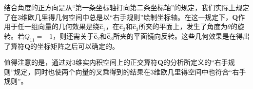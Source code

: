 \documentclass[main.tex]{subfiles}
\begin{document}
结合角度的正方向是从“第一条坐标轴打向第二条坐标轴”的规定，我们实际上规定了在3维欧几里得几何空间中总是以“右手规则”绘制坐标轴。在这一规定下，$\mathbf{Q}$作用于任一组向量的几何效果是绕$\mathbf{\hat{c}}_1$，在$\mathbf{\hat{c}}_2$和$\mathbf{\hat{c}}_3$所夹的平面上，发生了角度为$\theta$的旋转。若$Q_{11}=-1$，则还需关于$\mathbf{\hat{c}}_2$和$\mathbf{\hat{c}}_3$所夹的平面镜向反转。这些几何效果是在得出了算符$\mathbf{Q}$的坐标矩阵之后可以确定的。

值得注意的是，通过对3维实内积空间上的正交算符$\mathbf{Q}$的分析所定义的“右手规则”规定，同时也使两个向量的叉乘得到的结果在3维欧几里得空间中也符合“右手规则”。
\end{document}
